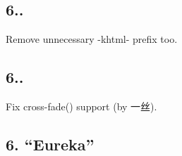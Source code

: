 \subsection*{6..}


\begin{DoxyItemize}
\item Remove unnecessary {\ttfamily -\/khtml-\/} prefix too.
\end{DoxyItemize}

\subsection*{6..}


\begin{DoxyItemize}
\item Fix {\ttfamily cross-\/fade()} support (by 一丝).
\end{DoxyItemize}

\subsection*{6. “\+Eureka”}


